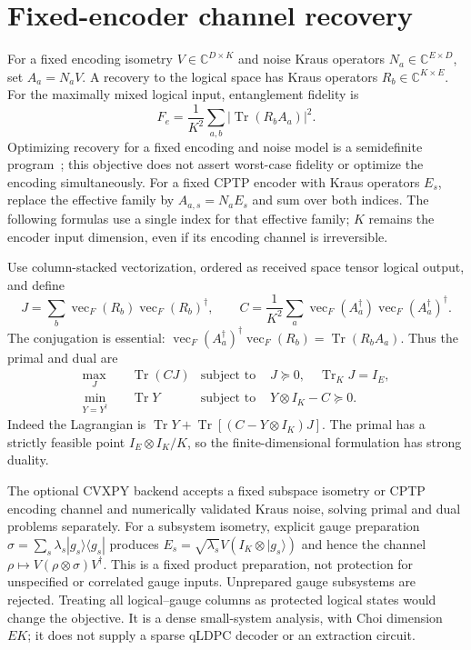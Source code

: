 \section{Fixed-encoder channel recovery}

For a fixed encoding isometry $V\in\mathbb C^{D\times K}$ and noise Kraus
operators $N_a\in\mathbb C^{E\times D}$, set $A_a=N_aV$. A recovery to
the logical space has Kraus operators $R_b\in\mathbb C^{K\times E}$.
For the maximally mixed logical input, entanglement fidelity is
\begin{equation}
 F_e=\frac{1}{K^2}\sum_{a,b}|\operatorname{Tr}(R_bA_a)|^2.
\end{equation}
Optimizing recovery for a fixed encoding and noise model is a
semidefinite program~\cite{fletcher2007}; this objective does not assert
worst-case fidelity or optimize the encoding simultaneously. For a fixed
CPTP encoder with Kraus operators $E_s$, replace the effective family by
$A_{a,s}=N_aE_s$ and sum over both indices. The following formulas use a
single index for that effective family; $K$ remains the encoder input
dimension, even if its encoding channel is irreversible.

Use column-stacked vectorization, ordered as received space tensor
logical output, and define
\begin{equation}
 J=\sum_b\operatorname{vec}_F(R_b)\operatorname{vec}_F(R_b)^\dagger,
 \qquad
 C=\frac{1}{K^2}\sum_a
 \operatorname{vec}_F(A_a^\dagger)\operatorname{vec}_F(A_a^\dagger)^\dagger.
\end{equation}
The conjugation is essential:
$\operatorname{vec}_F(A_a^\dagger)^\dagger\operatorname{vec}_F(R_b)
=\operatorname{Tr}(R_bA_a)$. Thus the primal and dual are
\begin{align}
 \max_J\quad &\operatorname{Tr}(CJ)
 &\text{subject to }&J\succeq0,\quad\operatorname{Tr}_{K}J=I_E,\\
 \min_{Y=Y^\dagger}\quad &\operatorname{Tr}Y
 &\text{subject to }&Y\otimes I_K-C\succeq0.
\end{align}
Indeed the Lagrangian is
$\operatorname{Tr}Y+\operatorname{Tr}[(C-Y\otimes I_K)J]$.
The primal has a strictly feasible point $I_E\otimes I_K/K$, so the
finite-dimensional formulation has strong duality.

The optional CVXPY backend accepts a fixed subspace isometry or CPTP
encoding channel and numerically validated Kraus noise, solving primal
and dual problems separately. For a subsystem isometry, explicit gauge
preparation $\sigma=\sum_s\lambda_s|g_s\rangle\langle g_s|$ produces
$E_s=\sqrt{\lambda_s}V(I_K\otimes|g_s\rangle)$ and hence the channel
$\rho\mapsto V(\rho\otimes\sigma)V^\dagger$. This is a fixed product
preparation, not protection for unspecified or correlated gauge inputs.
Unprepared gauge subsystems are rejected. Treating all logical--gauge
columns as protected logical states would change the objective. It is a dense
small-system analysis, with Choi dimension $EK$; it does not supply a
sparse qLDPC decoder or an extraction circuit.

